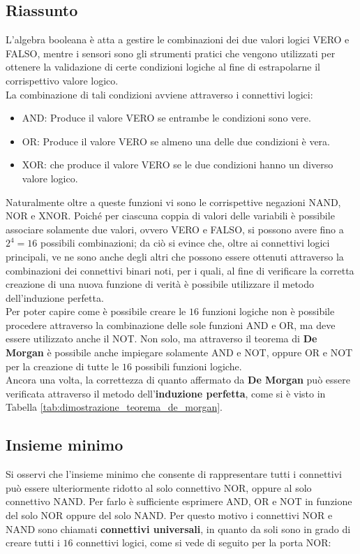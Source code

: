\documentclass[a4paper]{extarticle}
\begin{document}
\subsection{Riassunto}
L'algebra booleana è atta a gestire le combinazioni dei due valori logici VERO e FALSO, mentre i sensori sono gli strumenti pratici che vengono utilizzati per ottenere la validazione di certe condizioni logiche al fine di estrapolarne il corrispettivo valore logico.\\
La combinazione di tali condizioni avviene attraverso i connettivi logici:
\begin{itemize}
    \item AND: Produce il valore VERO se entrambe le condizioni sono vere.
    \item OR: Produce il valore VERO se almeno una delle due condizioni è vera.
    \item XOR: che produce il valore VERO se le due condizioni hanno un diverso valore logico.
\end{itemize}
Naturalmente oltre a queste funzioni vi sono le corrispettive negazioni NAND, NOR e XNOR. Poiché per ciascuna coppia di valori delle variabili è possibile associare solamente due valori, ovvero VERO e FALSO, si possono avere fino a \(2^{4} = 16\) possibili combinazioni; da ciò si evince che, oltre ai connettivi logici principali, ve ne sono anche degli altri che possono essere ottenuti attraverso la combinazioni dei connettivi binari noti, per i quali, al fine di verificare la corretta creazione di una nuova funzione di verità è possibile utilizzare il metodo dell'induzione perfetta.\\
Per poter capire come è possibile creare le \(16\) funzioni logiche non è possibile procedere attraverso la combinazione delle sole funzioni AND e OR, ma deve essere utilizzato anche il NOT. Non solo, ma attraverso il teorema di \textbf{De Morgan} è possibile anche impiegare solamente AND e NOT, oppure OR e NOT per la creazione di tutte le \(16\) possibili funzioni logiche.\\
Ancora una volta, la correttezza di quanto affermato da \textbf{De Morgan} può essere verificata attraverso il metodo dell'\textbf{induzione perfetta}, come si è visto in Tabella \ref{tab:dimostrazione_teorema_de_morgan}.

\subsection{Insieme minimo}
Si osservi che l’insieme minimo che consente di rappresentare tutti i connettivi può essere ulteriormente ridotto al solo connettivo NOR, oppure al solo connettivo NAND. Per farlo è sufficiente esprimere AND, OR e NOT in funzione del solo NOR oppure del solo NAND. Per questo motivo i connettivi NOR e NAND sono chiamati \textbf{connettivi universali}, in quanto da soli sono in grado di creare tutti i \(16\) connettivi logici, come si vede di seguito per la porta NOR:
\end{document}
